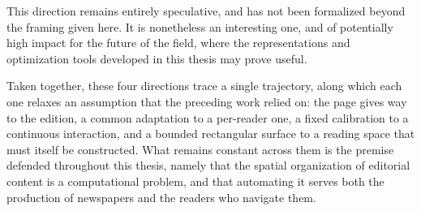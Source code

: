 This direction remains entirely speculative, and has not been formalized beyond the framing given here. It is nonetheless an interesting one, and of potentially high impact for the future of the field, where the representations and optimization tools developed in this thesis may prove useful.

\bigskip

\noindent Taken together, these four directions trace a single trajectory, along which each one relaxes an assumption that the preceding work relied on: the page gives way to the edition, a common adaptation to a per-reader one, a fixed calibration to a continuous interaction, and a bounded rectangular surface to a reading space that must itself be constructed. What remains constant across them is the premise defended throughout this thesis, namely that the spatial organization of editorial content is a computational problem, and that automating it serves both the production of newspapers and the readers who navigate them.